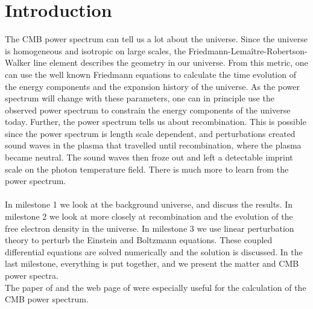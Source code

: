 \documentclass{aa}
\begin{document}
\section{Introduction}
The CMB power spectrum can tell us a lot about the universe. Since the universe is homogeneous and isotropic on large scales, the Friedmann-Lemaître-Robertson-Walker
line element describes the geometry in our universe. From this metric, one can use the well known Friedmann equations to calculate the time evolution of the energy components and the 
expansion history of the universe. As the power spectrum will change with these parameters, one can in principle use the observed power spectrum to constrain the energy components of the universe today. Further, the power spectrum
tells us about recombination. This is possible since the power spectrum is length scale dependent, and perturbations created sound waves in the plasma that travelled until recombination, where
the plasma became neutral. The sound waves then froze out and left a detectable imprint scale on the photon temperature field. There is much more to learn from the power spectrum.\\
\\
In milestone 1 we look at the background universe, and discuss the results. In milestone 2 we look at more closely at recombination and the evolution of the free electron density in the universe.
In milestone 3 we use linear perturbation theory to perturb the Einstein and Boltzmann equations. These coupled differential equations are solved numerically and the solution
is discussed. In the last milestone, everything is put together, and we present the matter and CMB power spectra.
\\
The paper of \cite{Callin} and the web page of \cite{winther:2023} were especially useful for the calculation of the CMB power spectrum.
\end{document}
